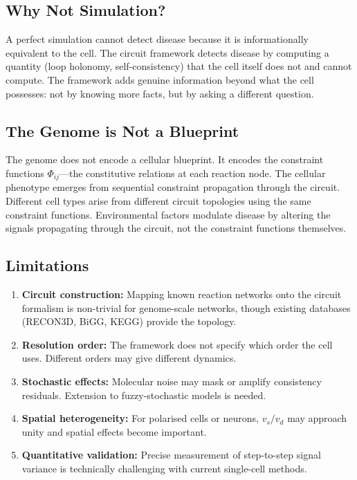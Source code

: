 \documentclass[10pt,twocolumn,a4paper]{article}
\theoremstyle{plain}
\theoremstyle{definition}
\theoremstyle{remark}
\begin{document}
\subsection{Why Not Simulation?}

A perfect simulation cannot detect disease because it is informationally equivalent to the cell. The circuit framework detects disease by computing a quantity (loop holonomy, self-consistency) that the cell itself does not and cannot compute. The framework adds genuine information beyond what the cell possesses: not by knowing more facts, but by asking a different question.

\subsection{The Genome is Not a Blueprint}

The genome does not encode a cellular blueprint. It encodes the constraint functions $\Phi_{ij}$---the constitutive relations at each reaction node. The cellular phenotype emerges from sequential constraint propagation through the circuit. Different cell types arise from different circuit topologies using the same constraint functions. Environmental factors modulate disease by altering the signals propagating through the circuit, not the constraint functions themselves.

\subsection{Limitations}

\begin{enumerate}[label=(\roman*)]
    \item \textbf{Circuit construction:} Mapping known reaction networks onto the circuit formalism is non-trivial for genome-scale networks, though existing databases (RECON3D, BiGG, KEGG) provide the topology.
    \item \textbf{Resolution order:} The framework does not specify which order the cell uses. Different orders may give different dynamics.
    \item \textbf{Stochastic effects:} Molecular noise may mask or amplify consistency residuals. Extension to fuzzy-stochastic models is needed.
    \item \textbf{Spatial heterogeneity:} For polarised cells or neurons, $v_s/v_d$ may approach unity and spatial effects become important.
    \item \textbf{Quantitative validation:} Precise measurement of step-to-step signal variance is technically challenging with current single-cell methods.
\end{enumerate}
\end{document}
